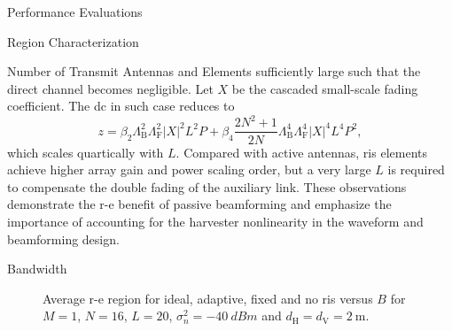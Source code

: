 \begin{section}{Performance Evaluations}
\begin{subsection}{ Region Characterization}
\begin{subsubsection}{Number of Transmit Antennas and  Elements}
sufficiently large such that the direct channel becomes negligible. Let $X$ be the cascaded small-scale fading coefficient. The \gls{dc} in such case reduces to
			\begin{equation}
				z = \beta_2 \Lambda_{\mathrm{B}}^2 \Lambda_{\mathrm{F}}^2 \lvert X \rvert^2 L^2 P + \beta_4 \frac{2N^2 + 1}{2N} \Lambda_{\mathrm{B}}^4 \Lambda_{\mathrm{F}}^4 \lvert X \rvert^4 L^4 P^2,
			\end{equation}
			which scales quartically with $L$. Compared with active antennas, \gls{ris} elements achieve higher array gain and power scaling order, but a very large $L$ is required to compensate the double fading of the auxiliary link. These observations demonstrate the \gls{r-e} benefit of passive beamforming and emphasize the importance of accounting for the harvester nonlinearity in the waveform and beamforming design.
		\end{subsubsection}

		\begin{subsubsection}{Bandwidth}
			\begin{figure}[H]
				\centering
				\subfloat[$B=\qty{1}{\MHz}$\label{fg:re_irs_1mhz}]{
					\resizebox{0.45\columnwidth}{!}{
						
					}
				}
				\subfloat[$B=\qty{10}{\MHz}$\label{fg:re_irs_10mhz}]{
					\resizebox{0.45\columnwidth}{!}{
						
					}
				}
				\caption{Average \gls{r-e} region for ideal, adaptive, fixed and no \gls{ris} versus $B$ for $M=1$, $N=16$, $L=20$, $\sigma_n^2=\qty{-40}{dBm}$ and $d_{\mathrm{H}}=d_{\mathrm{V}}=\qty{2}{\meter}$.}
			\end{figure}


\end{subsubsection}
\end{subsection}
\end{section}
